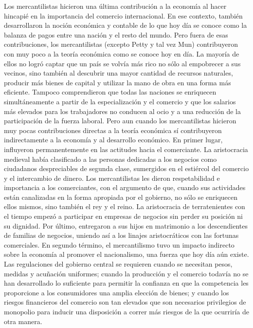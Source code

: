 \documentclass[
  jou,
  floatsintext,
  longtable,
  a4paper,
  nolmodern,
  notxfonts,
  notimes,
  colorlinks=true,linkcolor=blue,citecolor=blue,urlcolor=blue]{apa7}
\begin{document}
Los mercantilistas hicieron una última contribución a la economía al
hacer hincapié en la importancia del comercio internacional. En ese
contexto, también desarrollaron la noción económica y contable de lo que
hoy día se conoce como la balanza de pagos entre una nación y el resto
del mundo. Pero fuera de esas contribuciones, los mercantilistas
(excepto Petty y tal vez Mun) contribuyeron con muy poco a la teoría
económica como se conoce hoy en día. La mayoría de ellos no logró captar
que un país se volvía más rico no sólo al empobrecer a sus vecinos, sino
también al descubrir una mayor cantidad de recursos naturales, producir
más bienes de capital y utilizar la mano de obra en una forma más
eficiente. Tampoco comprendieron que todas las naciones se enriquecen
simultáneamente a partir de la especialización y el comercio y que los
salarios más elevados para los trabajadores no conducen al ocio y a una
reducción de la participación de la fuerza laboral. Pero aun cuando los
mercantilistas hicieron muy pocas contribuciones directas a la teoría
económica sí contribuyeron indirectamente a la economía y al desarrollo
económico. En primer lugar, influyeron permanentemente en las actitudes
hacia el comerciante. La aristocracia medieval había clasificado a las
personas dedicadas a los negocios como ciudadanos despreciables de
segunda clase, sumergidos en el estiércol del comercio y el intercambio
de dinero. Los mercantilistas les dieron respetabilidad e importancia a
los comerciantes, con el argumento de que, cuando sus actividades están
canalizadas en la forma apropiada por el gobierno, no sólo se enriquecen
ellos mismos, sino también el rey y el reino. La aristocracia de
terratenientes con el tiempo empezó a participar en empresas de negocios
sin perder su posición ni su dignidad. Por último, entregaron a sus
hijos en matrimonio a los descendientes de familias de negocios, uniendo
así a los linajes aristocráticos con las fortunas comerciales. En
segundo término, el mercantilismo tuvo un impacto indirecto sobre la
economía al promover el nacionalismo, una fuerza que hoy día aún existe.
Las regulaciones del gobierno central se requieren cuando se necesitan
pesos, medidas y acuñación uniformes; cuando la producción y el comercio
todavía no se han desarrollado lo suficiente para permitir la confianza
en que la competencia les proporcione a los consumidores una amplia
elección de bienes; y cuando los riesgos financieros del comercio son
tan elevados que son necesarios privilegios de monopolio para inducir
una disposición a correr más riesgos de la que ocurriría de otra manera.
\end{document}
